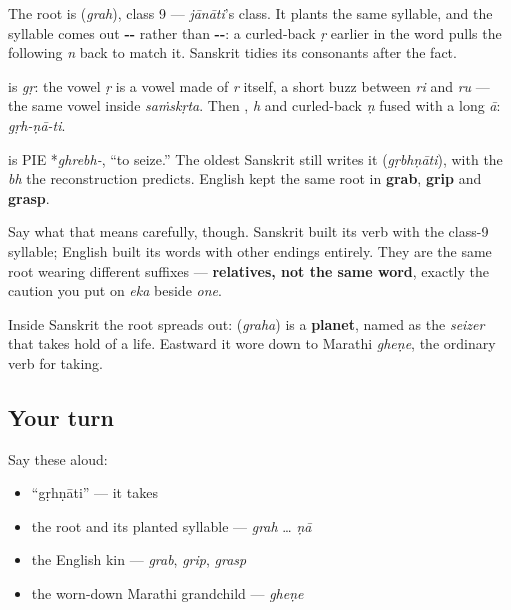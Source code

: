 The root is \textbf{} (\emph{grah}), class 9 — \emph{jānāti}'s class. It plants the same syllable, and the syllable comes out \textbf{--} rather than \textbf{--}: a curled-back \emph{ṛ} earlier in the word pulls the following \emph{n} back to match it. Sanskrit tidies its consonants after the fact.

\begin{sounds}
\textbf{} is \emph{gṛ}: the vowel \emph{ṛ} is a vowel made of \emph{r} itself, a short buzz between \emph{ri} and \emph{ru} — the same vowel inside \emph{saṁskṛta}. Then \textbf{}, \emph{h} and curled-back \emph{ṇ} fused with a long \emph{ā}: \emph{gṛh-ṇā-ti}.
\end{sounds}

\begin{cousinweb}
\textbf{} is PIE *\emph{ghrebh-}, \textquotedblleft{}to seize.\textquotedblright{} The oldest Sanskrit still writes it \textbf{} (\emph{gṛbhṇāti}), with the \emph{bh} the reconstruction predicts. English kept the same root in \textbf{grab}, \textbf{grip} and \textbf{grasp}.

Say what that means carefully, though. Sanskrit built its verb with the class-9 syllable; English built its words with other endings entirely. They are the same root wearing different suffixes — \textbf{relatives, not the same word}, exactly the caution you put on \emph{eka} beside \emph{one}.

Inside Sanskrit the root spreads out: \textbf{} (\emph{graha}) is a \textbf{planet}, named as the \emph{seizer} that takes hold of a life. Eastward it wore down to Marathi \emph{gheṇe}, the ordinary verb for taking.
\end{cousinweb}

\subsection*{Your turn}
Say these aloud:

\begin{itemize}
\raggedright
  \item \textquotedblleft{}gṛhṇāti\textquotedblright{} — it takes
  \item the root and its planted syllable — \emph{grah} … \emph{ṇā}
  \item the English kin — \emph{grab}, \emph{grip}, \emph{grasp}
  \item the worn-down Marathi grandchild — \emph{gheṇe}
\end{itemize}

